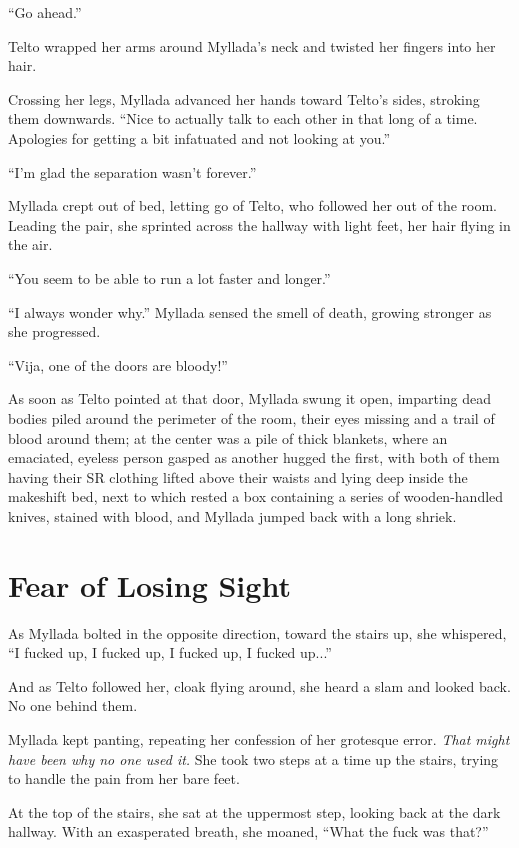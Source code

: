 ``Go ahead.''

Telto wrapped her arms around Myllada's neck and twisted her fingers into her hair.

Crossing her legs, Myllada advanced her hands toward Telto's sides, stroking them downwards. ``Nice to actually talk to each other in that long of a time. Apologies for getting a bit infatuated and not looking at you.''

``I'm glad the separation wasn't forever.''

Myllada crept out of bed, letting go of Telto, who followed her out of the room. Leading the pair, she sprinted across the hallway with light feet, her hair flying in the air.

``You seem to be able to run a lot faster and longer.''

``I always wonder why.'' Myllada sensed the smell of death, growing stronger as she progressed.

``Vija, one of the doors are bloody!''

As soon as Telto pointed at that door, Myllada swung it open, imparting dead bodies piled around the perimeter of the room, their eyes missing and a trail of blood around them; at the center was a pile of thick blankets, where an emaciated, eyeless person gasped as another hugged the first, with both of them having their SR clothing lifted above their waists and lying deep inside the makeshift bed, next to which rested a box containing a series of wooden-handled knives, stained with blood, and Myllada jumped back with a long shriek.

\chapter{Fear of Losing Sight}

As Myllada bolted in the opposite direction, toward the stairs up, she whispered, ``I fucked up, I fucked up, I fucked up, I fucked up...''

And as Telto followed her, cloak flying around, she heard a slam and looked back. No one behind them.

Myllada kept panting, repeating her confession of her grotesque error. \emph{That might have been why no one used it.} She took two steps at a time up the stairs, trying to handle the pain from her bare feet.

At the top of the stairs, she sat at the uppermost step, looking back at the dark hallway. With an exasperated breath, she moaned, ``What the fuck was that?''

